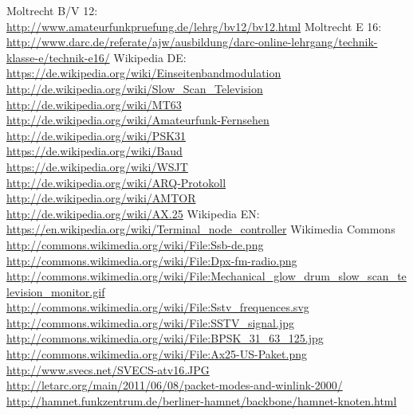 \begin{thebibliography}{}
      Moltrecht B/V 12: \\
                    \url{http://www.amateurfunkpruefung.de/lehrg/bv12/bv12.html}
       Moltrecht E 16: \\
                    \url{http://www.darc.de/referate/ajw/ausbildung/darc-online-lehrgang/technik-klasse-e/technik-e16/}
        Wikipedia DE: \\
                    \url{https://de.wikipedia.org/wiki/Einseitenbandmodulation}\\
                    \url{http://de.wikipedia.org/wiki/Slow_Scan_Television}\\
                    \url{http://de.wikipedia.org/wiki/MT63}\\
                    \url{http://de.wikipedia.org/wiki/Amateurfunk-Fernsehen}\\
                    \url{http://de.wikipedia.org/wiki/PSK31}\\
                    \url{https://de.wikipedia.org/wiki/Baud}\\
                    \url{https://de.wikipedia.org/wiki/WSJT}\\
                    \url{http://de.wikipedia.org/wiki/ARQ-Protokoll}\\
                    \url{http://de.wikipedia.org/wiki/AMTOR}\\
                    \url{http://de.wikipedia.org/wiki/AX.25}
        Wikipedia EN: \\
                    \url{https://en.wikipedia.org/wiki/Terminal_node_controller}
        Wikimedia Commons \\
                    \url{http://commons.wikimedia.org/wiki/File:Ssb-de.png}\\
                    \url{http://commons.wikimedia.org/wiki/File:Dpx-fm-radio.png}\\
                    \url{http://commons.wikimedia.org/wiki/File:Mechanical_glow_drum_slow_scan_television_monitor.gif}\\
                    \url{http://commons.wikimedia.org/wiki/File:Sstv_frequences.svg}\\
                    \url{http://commons.wikimedia.org/wiki/File:SSTV_signal.jpg}\\
                    \url{http://commons.wikimedia.org/wiki/File:BPSK_31_63_125.jpg}\\
                    \url{http://commons.wikimedia.org/wiki/File:Ax25-US-Paket.png}
       \url{http://www.svecs.net/SVECS-atv16.JPG}
      \url{http://letarc.org/main/2011/06/08/packet-modes-and-winlink-2000/}
    \url{http://hamnet.funkzentrum.de/berliner-hamnet/backbone/hamnet-knoten.html}

\end{thebibliography} 



